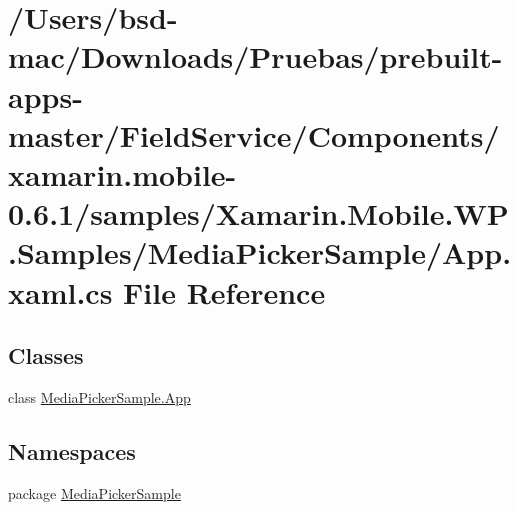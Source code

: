 \hypertarget{_components_2xamarin_8mobile-0_86_81_2samples_2_xamarin_8_mobile_8_w_p_8_samples_2_media_picker_sample_2_app_8xaml_8cs}{\section{/\+Users/bsd-\/mac/\+Downloads/\+Pruebas/prebuilt-\/apps-\/master/\+Field\+Service/\+Components/xamarin.mobile-\/0.6.1/samples/\+Xamarin.Mobile.\+W\+P.\+Samples/\+Media\+Picker\+Sample/\+App.xaml.\+cs File Reference}
\label{_components_2xamarin_8mobile-0_86_81_2samples_2_xamarin_8_mobile_8_w_p_8_samples_2_media_picker_sample_2_app_8xaml_8cs}
}
\subsection*{Classes}
\begin{DoxyCompactItemize}
\item 
class \hyperlink{class_media_picker_sample_1_1_app}{Media\+Picker\+Sample.\+App}
\end{DoxyCompactItemize}
\subsection*{Namespaces}
\begin{DoxyCompactItemize}
\item 
package \hyperlink{namespace_media_picker_sample}{Media\+Picker\+Sample}
\end{DoxyCompactItemize}
